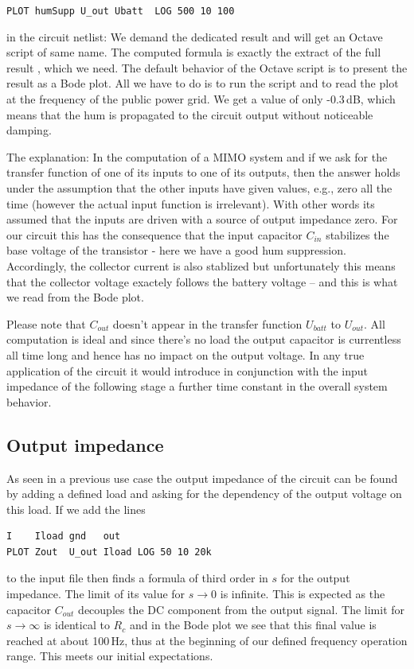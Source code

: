 \verb+PLOT humSupp U_out Ubatt  LOG 500 10 100+

in the circuit netlist: We demand the dedicated result  and
will get an Octave script of same name. The computed formula is exactly
the extract of the full result , which we need. The default
behavior of the Octave script is to present the result as
a Bode plot. All we have to do is to run the script and to read the plot
at the frequency of the public power grid. We get a value of only
-0.3\,dB, which means that the hum is propagated to the circuit output
without noticeable damping.

The explanation: In the computation of a MIMO system and if we ask for the
transfer function of one of its inputs to one of its outputs, then the
answer holds under the assumption that the other inputs have given values,
e.g., zero all the time (however the actual input function is irrelevant).
With other words its assumed that the inputs are driven with a source of
output impedance zero. For our circuit this has the consequence that the
input capacitor $C_{in}$ stabilizes the base voltage of the transistor -
here we have a good hum suppression. Accordingly, the collector current is
also stablized but unfortunately this means that the collector voltage
exactely follows the battery voltage -- and this is what we read from the
Bode plot.

Please note that $C_{out}$ doesn't appear in the transfer function
$U_{batt}$ to $U_{out}$. All computation is ideal and since there's no
load the output capacitor is currentless all time long and hence has no
impact on the output voltage. In any true application of the circuit it
would introduce in conjunction with the input impedance of the following
stage a further time constant in the overall system behavior.


\subsection{Output impedance}

As seen in a previous use case the output impedance of the circuit can be
found by adding a defined load and asking for the dependency of the output
voltage on this load. If we add the lines
\begin{verbatim}
I    Iload gnd   out   
PLOT Zout  U_out Iload LOG 50 10 20k
\end{verbatim}
to the input file then \linnet{} finds a formula of third order in $s$ for
the output impedance. The limit of its value for $s \to 0$ is infinite.
This is expected as the capacitor $C_{out}$ decouples the DC component
from the output signal. The limit for $s \to \infty$ is identical to $R_c$
and in the Bode plot we see that this final value is reached at about
100\,Hz, thus at the beginning of our defined frequency operation range.
This meets our initial expectations.

